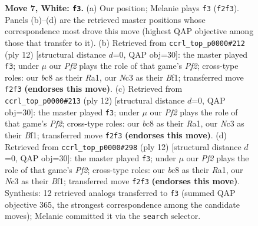 \documentclass[11pt]{article}
\begin{document}
\begin{figure}[p]
\caption{\textbf{Move 7, White: \texttt{f3}.} (a) Our position; Melanie plays \texttt{f3} (\texttt{f2f3}). Panels (b)--(d) are the retrieved master positions whose correspondence most drove this move (highest QAP objective among those that transfer to it). (b) Retrieved from \texttt{ccrl\_top\_p0000\#212} (ply 12) [structural distance $d$=0, QAP obj=30]: the master played \texttt{f3}; under $\mu$ our \emph{Pf2} plays the role of that game's \emph{Pf2}; cross-type roles: our \emph{b}c8 as their \emph{R}a1, our \emph{N}c3 as their \emph{B}f1; transferred move \texttt{f2f3} \textbf{(endorses this move)}. (c) Retrieved from \texttt{ccrl\_top\_p0000\#213} (ply 12) [structural distance $d$=0, QAP obj=30]: the master played \texttt{f3}; under $\mu$ our \emph{Pf2} plays the role of that game's \emph{Pf2}; cross-type roles: our \emph{b}c8 as their \emph{R}a1, our \emph{N}c3 as their \emph{B}f1; transferred move \texttt{f2f3} \textbf{(endorses this move)}. (d) Retrieved from \texttt{ccrl\_top\_p0000\#298} (ply 12) [structural distance $d$=0, QAP obj=30]: the master played \texttt{f3}; under $\mu$ our \emph{Pf2} plays the role of that game's \emph{Pf2}; cross-type roles: our \emph{b}c8 as their \emph{R}a1, our \emph{N}c3 as their \emph{B}f1; transferred move \texttt{f2f3} \textbf{(endorses this move)}. Synthesis: 12 retrieved analogs transferred to \texttt{f3} (summed QAP objective 365, the strongest correspondence among the candidate moves); Melanie committed it via the \texttt{search} selector.}
\label{fig:thought-m12}
\end{figure}

\clearpage
\end{document}
